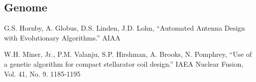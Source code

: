 \documentclass[letterpaper]{article}
\renewcommand\_{\textunderscore\allowbreak}
\begin{document}
\subsection{Genome}



\begin{thebibliography}{9}

G.S. Hornby, A. Globus, D.S. Linden, J.D. Lohn, ``Automated Antenna Design with Evolutionary Algorithms.'' AIAA

W.H. Miner, Jr., P.M. Valanju, S.P. Hirshman, A. Brooks, N. Pomphrey, ``Use of a genetic algorithm for compact stellarator coil design.'' IAEA Nuclear Fusion, Vol. 41, No. 9. 1185-1195

\end{thebibliography}
\end{document}

